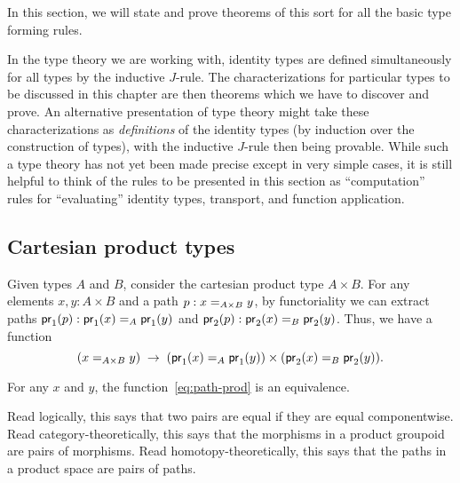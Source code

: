 In this section, we will state and prove theorems of this sort for all the basic type forming rules.

\begin{rmk}
  In the type theory we are working with, identity types are defined simultaneously for all types by the inductive $J$-rule.
  The characterizations for particular types to be discussed in this chapter are then theorems which we have to discover and prove.
  An alternative presentation of type theory might take these characterizations as \emph{definitions} of the identity types (by induction over the construction of types), with the inductive $J$-rule then being provable.
  While such a type theory has not yet been made precise except in very simple cases, it is still helpful to think of the rules to be presented in this section as ``computation'' rules for ``evaluating'' identity types, transport, and function application.
\end{rmk}

\subsection{Cartesian product types}
\label{sec:compute-cartprod}

Given types $A$ and $B$, consider the cartesian product type $A \times B$.  
For any elements $x,y:A\times B$ and a path $p:\id[A\times B]{x}{y}$, by functoriality we can extract paths $\ap{\proj1}p:\id[A]{\proj1(x)}{\proj1(y)}$ and $\ap{\proj2}p:\id[B]{\proj2(x)}{\proj2(y)}$.
Thus, we have a function
\begin{equation}
  (\id[A\times B]{x}{y}) \;\to\; (\id[A]{\proj1(x)}{\proj1(y)}) \times (\id[B]{\proj2(x)}{\proj2(y)}).\label{eq:path-prod}
\end{equation}

\begin{thm}\label{thm:path-prod}
  For any $x$ and $y$, the function~\eqref{eq:path-prod} is an equivalence.
\end{thm}

Read logically, this says that two pairs are equal if they are equal
componentwise.  Read category-theoretically, this says that the
morphisms in a product groupoid are pairs of morphisms.  Read
homotopy-theoretically, this says that the paths in a product
space are pairs of paths.

